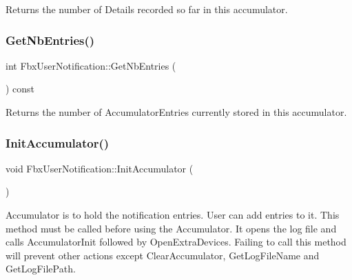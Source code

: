 Returns the number of Details recorded so far in this accumulator. 

\mbox{\label{class_fbx_user_notification_af952064b707c1a6165590e83497940af}} 
\subsubsection{\texorpdfstring{Get\+Nb\+Entries()}{GetNbEntries()}}
{\footnotesize\ttfamily int Fbx\+User\+Notification\+::\+Get\+Nb\+Entries (\begin{DoxyParamCaption}{ }\end{DoxyParamCaption}) const}



Returns the number of Accumulator\+Entries currently stored in this accumulator. 

\mbox{\label{class_fbx_user_notification_a1ed0d1420841b06af2b361dc0c3d7017}} 
\subsubsection{\texorpdfstring{Init\+Accumulator()}{InitAccumulator()}}
{\footnotesize\ttfamily void Fbx\+User\+Notification\+::\+Init\+Accumulator (\begin{DoxyParamCaption}{ }\end{DoxyParamCaption})}

Accumulator is to hold the notification entries. User can add entries to it. This method must be called before using the Accumulator. It opens the log file and calls Accumulator\+Init followed by Open\+Extra\+Devices. Failing to call this method will prevent other actions except Clear\+Accumulator, Get\+Log\+File\+Name and Get\+Log\+File\+Path. \mbox{\label{class_fbx_user_notification_a769c1f94ef0032d465c777ff78dc698b}} 
